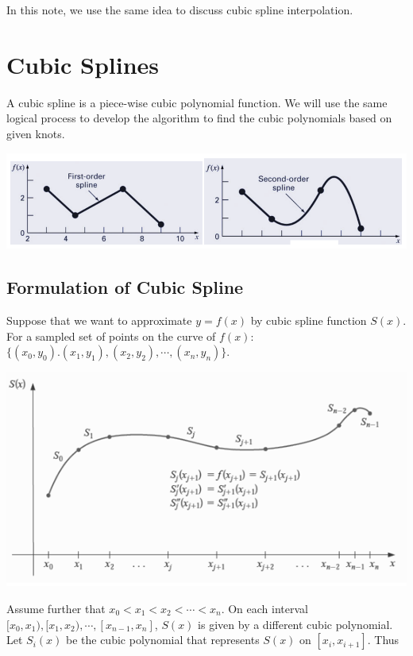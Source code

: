 \documentclass[
]{book}
\begin{document}
In this note, we use the same idea to discuss cubic spline interpolation.

\hfill\break

\hypertarget{cubic-splines}{%
\section{Cubic Splines}\label{cubic-splines}}

A cubic spline is a piece-wise cubic polynomial function. We will use the same logical process to develop the algorithm to find the cubic polynomials based on given knots.

\hfill\break

\begin{center}\includegraphics[width=0.85\linewidth]{img11/w11-LinearQuadraticSplineDemo} \end{center}

\hfill\break

\hypertarget{formulation-of-cubic-spline}{%
\subsection{Formulation of Cubic Spline}\label{formulation-of-cubic-spline}}

Suppose that we want to approximate \(y = f(x)\) by cubic spline function \(S(x)\). For a sampled set of points on the curve of \(f(x)\): \(\{(x_0, y_0). (x_1, y_1), (x_2, y_2), \cdots, (x_n, y_n) \}\).

\begin{center}\includegraphics[width=0.55\linewidth]{img11/13-cubicSplineDemo} \end{center}

Assume further that \(x_0 < x_1 <x_2 < \cdots <x_n\). On each interval \([x_0, x_1), [x_1, x_2), \cdots, [x_{n-1}, x_n]\), \(S(x)\) is given by a different cubic polynomial. Let \(S_i(x)\) be the cubic polynomial that represents \(S(x)\) on \([x_i, x_{i+1}]\). Thus
\end{document}
